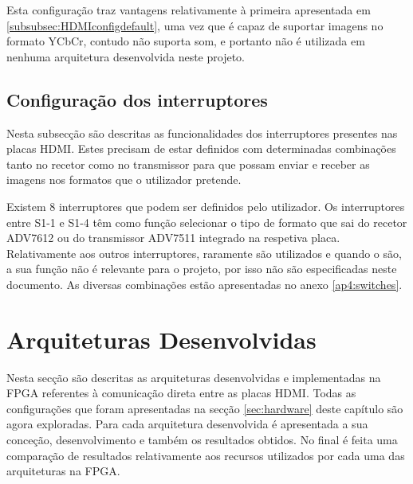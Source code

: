 Esta configuração traz vantagens relativamente à primeira apresentada em \ref{subsubsec:HDMIconfigdefault}, uma vez que é capaz de suportar imagens no formato YCbCr, contudo não suporta som, e portanto não é utilizada em nenhuma arquitetura desenvolvida neste projeto. 


\subsection{Configuração dos interruptores}

Nesta subsecção são descritas as funcionalidades dos interruptores presentes nas placas HDMI. Estes precisam de estar definidos com determinadas combinações tanto no recetor como no transmissor para que possam enviar e receber as imagens nos formatos que o utilizador pretende.

Existem 8 interruptores que podem ser definidos pelo utilizador. Os interruptores entre S1-1 e S1-4 têm como função selecionar o tipo de formato que sai do recetor ADV7612 ou do transmissor ADV7511 integrado na respetiva placa. Relativamente aos outros interruptores, raramente são utilizados e quando o são, a sua função não é relevante para o projeto, por isso não são especificadas neste documento. As diversas combinações estão apresentadas no anexo \ref{ap4:switches}.


\section{Arquiteturas Desenvolvidas} \label{sec:HDMIarquiteturas}

Nesta secção são descritas as arquiteturas desenvolvidas e implementadas na FPGA referentes à comunicação direta entre as placas HDMI. Todas as configurações que foram apresentadas na secção \ref{sec:hardware} deste capítulo são agora exploradas. Para cada arquitetura desenvolvida é apresentada a sua conceção, desenvolvimento e também os resultados obtidos. No final é feita uma comparação de resultados relativamente aos recursos utilizados por cada uma das arquiteturas na FPGA.


